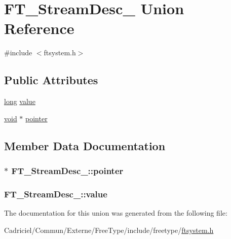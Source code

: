 \hypertarget{union_f_t___stream_desc__}{\section{F\-T\-\_\-\-Stream\-Desc\-\_\- Union Reference}
\label{union_f_t___stream_desc__}
}


{\ttfamily \#include $<$ftsystem.\-h$>$}

\subsection*{Public Attributes}
\begin{DoxyCompactItemize}
\item 
\hyperlink{_free_image_8h_a7701bb16365a51acda9234120673781d}{long} \hyperlink{union_f_t___stream_desc___a1a94493032faef1c3ed7bc33816ce90c}{value}
\item 
\hyperlink{wglew_8h_aeea6e3dfae3acf232096f57d2d57f084}{void} $\ast$ \hyperlink{union_f_t___stream_desc___a410ed102dc377fb9a5b9c950c3f863dc}{pointer}
\end{DoxyCompactItemize}


\subsection{Member Data Documentation}
\hypertarget{union_f_t___stream_desc___a410ed102dc377fb9a5b9c950c3f863dc}{
\subsubsection[{pointer}]{$\ast$ F\-T\-\_\-\-Stream\-Desc\-\_\-\-::pointer}}\label{union_f_t___stream_desc___a410ed102dc377fb9a5b9c950c3f863dc}
\hypertarget{union_f_t___stream_desc___a1a94493032faef1c3ed7bc33816ce90c}{
\subsubsection[{value}]{ F\-T\-\_\-\-Stream\-Desc\-\_\-\-::value}}\label{union_f_t___stream_desc___a1a94493032faef1c3ed7bc33816ce90c}


The documentation for this union was generated from the following file\-:\begin{DoxyCompactItemize}
\item 
Cadriciel/\-Commun/\-Externe/\-Free\-Type/include/freetype/\hyperlink{ftsystem_8h}{ftsystem.\-h}\end{DoxyCompactItemize}
